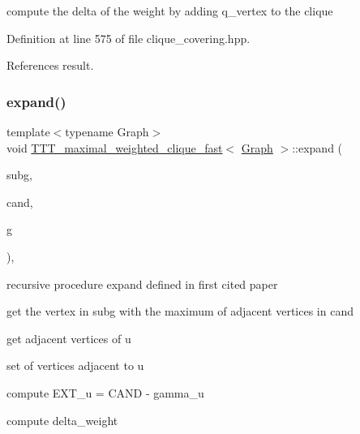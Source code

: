 compute the delta of the weight by adding q\+\_\+vertex to the clique 



Definition at line 575 of file clique\+\_\+covering.\+hpp.



References result.

\mbox{\label{classTTT__maximal__weighted__clique__fast_afa776883f9aeaca8194a842c8b333fc4}} 
\subsubsection{\texorpdfstring{expand()}{expand()}}
{\footnotesize\ttfamily template$<$typename Graph$>$ \\
void \hyperlink{classTTT__maximal__weighted__clique__fast}{T\+T\+T\+\_\+maximal\+\_\+weighted\+\_\+clique\+\_\+fast}$<$ \hyperlink{structGraph}{Graph} $>$\+::expand (\begin{DoxyParamCaption}\item[{\hyperlink{classCustomUnorderedSet}{Custom\+Unordered\+Set}$<$ \hyperlink{classTTT__maximal__weighted__clique__fast_a55ca1f8931415f7338827925b86c218d}{vertex} $>$ \&}]{subg,  }\item[{\hyperlink{classCustomUnorderedSet}{Custom\+Unordered\+Set}$<$ \hyperlink{classTTT__maximal__weighted__clique__fast_a55ca1f8931415f7338827925b86c218d}{vertex} $>$ \&}]{cand,  }\item[{const \hyperlink{structGraph}{Graph} \&}]{g }\end{DoxyParamCaption})\hspace{0.3cm}{\ttfamily [inline]}, {\ttfamily [private]}}



recursive procedure expand defined in first cited paper 

get the vertex in subg with the maximum of adjacent vertices in cand

get adjacent vertices of u

set of vertices adjacent to u

compute E\+X\+T\+\_\+u = C\+A\+ND -\/ gamma\+\_\+u

compute delta\+\_\+weight 


